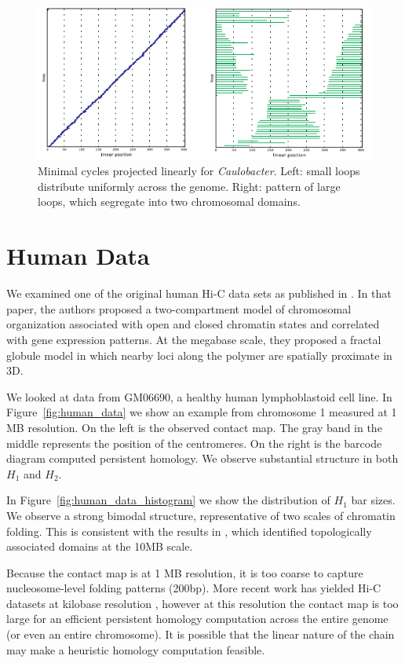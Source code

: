 \begin{figure}
       \centering
       \includegraphics[width=\columnwidth]{./fig/caulobacter_localized_loops.pdf}
       \caption{Minimal cycles projected linearly for \emph{Caulobacter}. Left: small loops distribute uniformly across the genome. Right: pattern of large loops, which segregate into two chromosomal domains.}
       \label{fig:caulobacter_bar_sizes}
\end{figure}

\section{Human Data}
\label{sec:human_data}
%
We examined one of the original human Hi-C data sets as published in \cite{LiebermanAiden:2009jz}.
In that paper, the authors proposed a two-compartment model of chromosomal organization associated with open and closed chromatin states and correlated with gene expression patterns.
At the megabase scale, they proposed a fractal globule model in which nearby loci along the polymer are spatially proximate in 3D.

We looked at data from GM06690, a healthy human lymphoblastoid cell line.
In Figure~\ref{fig:human_data} we show an example from chromosome 1 measured at 1 MB resolution.
On the left is the observed contact map.
The gray band in the middle represents the position of the centromeres.
On the right is the barcode diagram computed persistent homology.
We observe substantial structure in both $H_1$ and $H_2$.

In Figure~\ref{fig:human_data_histogram} we show the distribution of $H_1$ bar sizes.
We observe a strong bimodal structure, representative of two scales of chromatin folding.
This is consistent with the results in \cite{LiebermanAiden:2009jz}, which identified topologically associated domains at the 10MB scale.

Because the contact map is at 1 MB resolution, it is too coarse to capture nucleosome-level folding patterns (200bp).
More recent work has yielded Hi-C datasets at kilobase resolution \cite{Jin:2013hm,Rao:2014eo}, however at this resolution the contact map is too large for an efficient persistent homology computation across the entire genome (or even an entire chromosome).
It is possible that the linear nature of the chain may make a heuristic homology computation feasible.

